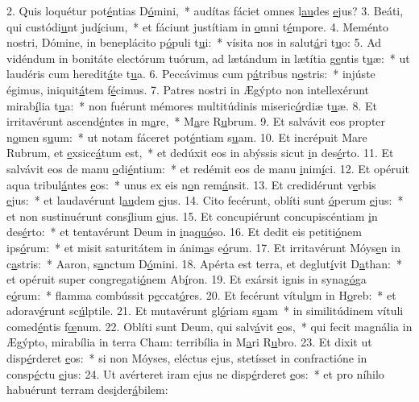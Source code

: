 2. Quis loquétur pot\uline{é}ntias D\uline{ó}mini,~* audítas fáciet omnes l\uline{au}des \uline{e}jus?
3. Beáti, qui custódi\uline{u}nt jud\uline{í}cium,~* et fáciunt justítiam in \uline{o}mni t\uline{é}mpore.
4. Meménto nostri, Dómine, in beneplácito p\uline{ó}puli t\uline{u}i:~* vísita nos in salut\uline{á}ri t\uline{u}o:
5. Ad vidéndum in bonitáte electórum tuórum, ad lætándum in lætítia g\uline{e}ntis t\uline{u}æ:~* ut laudéris cum heredit\uline{á}te t\uline{u}a.
6. Peccávimus cum p\uline{á}tribus n\uline{o}stris:~* injúste égimus, iniquit\uline{á}tem f\uline{é}cimus.
7. Patres nostri in Ægýpto non intellexérunt mirab\uline{í}lia t\uline{u}a:~* non fuérunt mémores multitúdinis miseric\uline{ó}rdiæ t\uline{u}æ.
8. Et irritavérunt ascend\uline{é}ntes in m\uline{a}re,~* M\uline{a}re R\uline{u}brum.
9. Et salvávit eos propter n\uline{o}men s\uline{u}um:~* ut notam fáceret pot\uline{é}ntiam s\uline{u}am.
10. Et incrépuit Mare Rubrum, et \uline{e}xsicc\uline{á}tum est,~* et dedúxit eos in abýssis sicut \uline{i}n des\uline{é}rto.
11. Et salvávit eos de manu \uline{o}di\uline{é}ntium:~* et redémit eos de manu \uline{i}nim\uline{í}ci.
12. Et opéruit aqua tribul\uline{á}ntes \uline{e}os:~* unus ex eis n\uline{o}n rem\uline{á}nsit.
13. Et credidérunt v\uline{e}rbis \uline{e}jus:~* et laudavérunt l\uline{au}dem \uline{e}jus.
14. Cito fecérunt, oblíti sunt \uline{ó}perum \uline{e}jus:~* et non sustinuérunt cons\uline{í}lium \uline{e}jus.
15. Et concupiérunt concupiscéntiam \uline{i}n des\uline{é}rto:~* et tentavérunt Deum in \uline{i}na\uline{quó}so.
16. Et dedit eis petiti\uline{ó}nem ips\uline{ó}rum:~* et misit saturitátem in ánim\uline{a}s e\uline{ó}rum.
17. Et irritavérunt Móys\uline{e}n in c\uline{a}stris:~* Aaron, s\uline{a}nctum D\uline{ó}mini.
18. Apérta est terra, et deglut\uline{í}vit D\uline{a}than:~* et opéruit super congregati\uline{ó}nem Ab\uline{í}ron.
19. Et exársit ignis in synag\uline{ó}ga e\uline{ó}rum:~* flamma combússit p\uline{e}ccat\uline{ó}res.
20. Et fecérunt vítul\uline{u}m in H\uline{o}reb:~* et adorav\uline{é}runt sc\uline{ú}lptile.
21. Et mutavérunt gl\uline{ó}riam s\uline{u}am~* in similitúdinem vítuli comed\uline{é}ntis f\uline{œ}num.
22. Oblíti sunt Deum, qui salv\uline{á}vit \uline{e}os,~* qui fecit magnália in Ægýpto, mirabília in terra Cham: terribília in M\uline{a}ri R\uline{u}bro.
23. Et dixit ut disp\uline{é}rderet \uline{e}os:~* si non Móyses, eléctus ejus, stetísset in confractióne in consp\uline{é}ctu \uline{e}jus:
24. Ut avérteret iram ejus ne disp\uline{é}rderet \uline{e}os:~* et pro níhilo habuérunt terram des\uline{i}der\uline{á}bilem:
